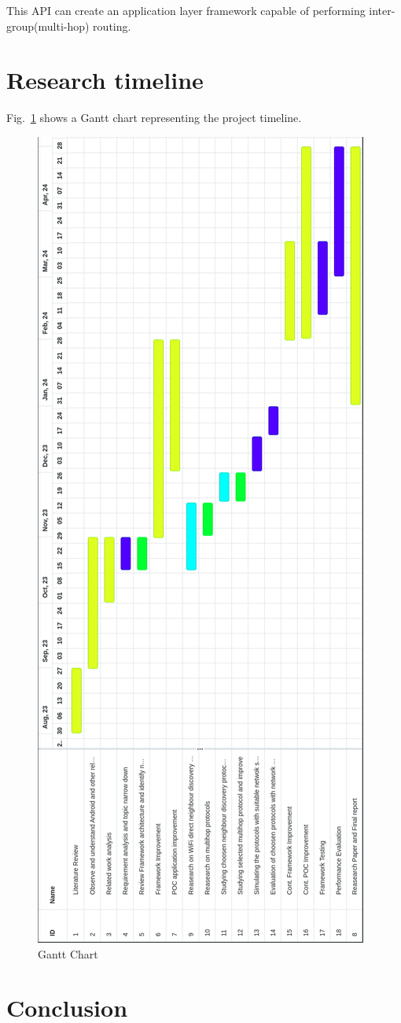 \documentclass[12pt, conference, onecolumn, a4paper]{IEEEtran}
\begin{document}
\vspace{0.1cm}

This API can create an application layer framework capable of performing
inter-group(multi-hop) routing.

\newpage

\section{Research timeline}

Fig.~\ref{gantt} shows a Gantt chart representing the project timeline.

\begin{figure}[htbp]
    \centerline{\includegraphics[height=1.4\textwidth]{imgs/gantt.png}}
    \caption{Gantt Chart}
    \label{gantt}
\end{figure}

\section{Conclusion}
\end{document}
